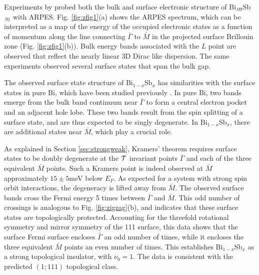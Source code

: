 \documentclass[twocolumn,floatfix,showpacs,rmp,aps]{revtex4}
\begin{document}
	Experiments by \textcite{hsieh08} probed both the bulk and
	surface electronic structure of Bi$_{.09}$Sb$_{.91}$ with ARPES.
	Fig. \ref{fig:zfig1}(a) shows the ARPES spectrum, which can be interpreted
	as a map of the energy of the occupied electronic states as a function
	of momentum along the line connecting $\bar\Gamma$ to $\bar M$ in the projected
	surface Brillouin zone (Fig. \ref{fig:zfig1}(b)).
	Bulk energy bands associated with the $L$ point are observed that reflect the
	nearly linear 3D Dirac like dispersion.
	The same experiments observed several surface states that span the bulk gap.
	
	The observed surface state structure of Bi$_{1-x}$Sb$_x$ has similarities with the
	surface states in pure Bi, which have been studied
	previously \cite{patthey94,agergaard01,ast01,hirahara06,hofmann06}.  In pure Bi, two
	bands emerge from the bulk band continuum near $\bar\Gamma$ to form a central
	electron pocket and an adjacent hole lobe.  These two bands result from the
	spin splitting of a surface state, and are thus expected to be singly
	degenerate.  In Bi$_{1-x}$Sb$_x$, there are additional states near $\bar M$,
	which play a crucial role.
	
	As explained in Section \ref{sec:strongweak}, Kramers' theorem requires surface states to be
	doubly degenerate at the ${\cal T}$ invariant points $\bar\Gamma$ and each of the
	three equivalent $\bar M$ points.
	Such a Kramers point is indeed observed at $\bar M$ approximately $15\pm 5$meV below
	$E_F$.  As expected for a system
	with strong spin orbit interactions, the degeneracy is lifted away from $\bar M$.
	The observed surface bands cross the Fermi energy 5 times between $\bar\Gamma$ and
	$\bar M$.  This odd number of crossings is analogous to Fig. \ref{fig:zigzag}(b),
	and indicates that these surface states are topologically protected.
	Accounting for the threefold rotational symmetry and mirror symmetry of the
	111 surface, this data shows that the surface Fermi surface encloses
	$\bar\Gamma$ an odd number of times, while it encloses the three equivalent
	$\bar M$ points an even number of times.  This establishes Bi$_{1-x}$Sb$_x$ as
	a strong topological
	insulator, with $\nu_0 = 1$.  The data is consistent with the predicted
	$(1;111)$ topological class.
	
\end{document}
